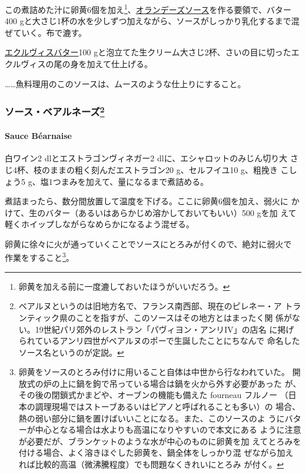 \begin{recette}
この煮詰めた汁に卵黄6個を加え\footnote{卵黄を加える前に一度漉しておいたほうがいいだろう。}、\protect\hyperlink{sauce-hollandaise}{オランデーズソース}を作る要領で、バター400
gと大さじ1\undemi{}杯の水を少しずつ加えながら、ソースがしっかり乳化するまで混ぜていく。布で漉す。

\protect\hyperlink{beurre-d-ecrevisse}{エクルヴィスバター}100
gと泡立てた生クリーム大さじ2杯、さいの目に切ったエクルヴィスの尾の身を加えて仕上げる。

\ldots{}\ldots{}魚料理用のこのソースは、ムースのような仕上りにすること。

\maeaki

\hypertarget{ux30bdux30fcux30b9ux30d9ux30a2ux30ebux30cdux30fcux30ba8}{%
\subsubsection[ソース・ベアルネーズ]{\texorpdfstring{ソース・ベアルネーズ\footnote{ベアルヌというのは旧地方名で、フランス南西部、現在のピレネー・ア
  トランティック県のことを指すが、このソースはその地方とはまったく関
  係がない。19世紀パリ郊外のレストラン「パヴィヨン・アンリIV」の店名
  に掲げられているアンリ四世がベアルヌのポーで生誕したことにちなんで
  命名したソース名というのが定説。}}{ソース・ベアルネーズ}}\label{ux30bdux30fcux30b9ux30d9ux30a2ux30ebux30cdux30fcux30ba8}}

\hypertarget{sauce-bearnaise}{%
\paragraph{Sauce Béarnaise}\label{sauce-bearnaise}}


白ワイン2 dlとエストラゴンヴィネガー2 dlに、エシャロットのみじん切り大
さじ4杯、枝のままの粗く刻んだエストラゴン20 g、セルフイユ10 g、粗挽き
こしょう5 g、塩1つまみを加えて、\untiers{}量になるまで煮詰める。

煮詰まったら、数分間放置して温度を下げる。ここに卵黄6個を加え、弱火に
かけて、生のバター（あるいはあらかじめ溶かしておいてもいい）500 gを加
えて軽くホイップしながらなめらかになるよう混ぜる。

卵黄に徐々に火が通っていくことでソースにとろみが付くので、絶対に弱火で
作業をすること\footnote{卵黄をソースのとろみ付けに用いること自体は中世から行なわれていた。
  開放式の炉の上に鍋を鉤で吊っている場合は鍋を火から外す必要があった
  が、その後の閉鎖式かまどや、オーブンの機能も備えた fourneau フルノー
  （日本の調理現場ではストーブあるいはピアノと呼ばれることも多い）の
  場合、熱の弱い部分に鍋を置けばいいことになる。また、このソースのよ
  うにバターが中心となる場合は水よりも高温になりやすいので本文にある
  ように注意が必要だが、ブランケットのような水が中心のものに卵黄を加
  えてとろみを付ける場合、よく溶きほぐした卵黄を、鍋全体をしっかり混
  ぜながら加えれば比較的高温（微沸騰程度）でも問題なくきれいにとろみ
  が付く。}。


\end{recette}
